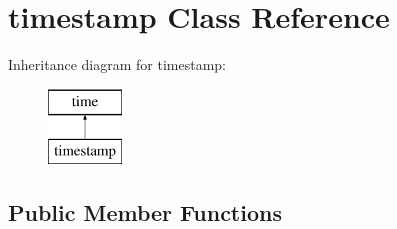 \hypertarget{classtimestamp}{}\section{timestamp Class Reference}
\label{classtimestamp}
Inheritance diagram for timestamp\+:\begin{figure}[H]
\begin{center}
\leavevmode
\includegraphics[height=2.000000cm]{classtimestamp}
\end{center}
\end{figure}
\subsection*{Public Member Functions}
